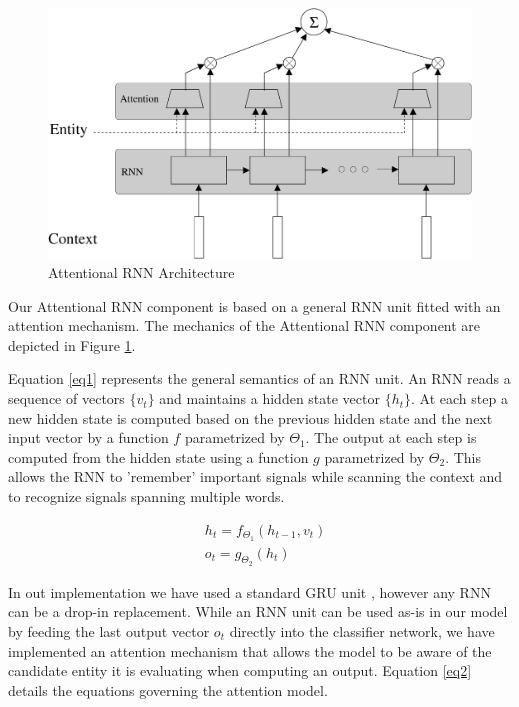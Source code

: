 \documentclass[11pt]{article}
\begin{document}
\begin{figure}
\centering
\includegraphics[scale=0.25]{diagrams/RNN_ATTN.pdf}
\caption{Attentional RNN Architecture}
\label{fig:arnn}
\end{figure}	

Our Attentional RNN component is based on a general RNN unit fitted with an attention mechanism. The mechanics of the Attentional RNN component are depicted in Figure \ref{fig:arnn}. 
	
Equation \ref{eq1} represents the general semantics of an RNN unit. An RNN reads a sequence of vectors $\{v_t\}$ and maintains a hidden state vector $\{h_t\}$. At each step a new hidden state is computed based on the previous hidden state and the next input vector by a function $f$ parametrized by $\Theta_1$. The output at each step is computed from the hidden state using a function $g$ parametrized by $\Theta_2$. This allows the RNN to 'remember' important signals while scanning the context and to recognize signals spanning multiple words.

\begin{equation}
\label{eq1}
\begin{aligned}
& h_t=f_{\Theta_1}(h_{t-1}, v_t) \\
& o_t=g_{\Theta_2}(h_t)
\end{aligned}
\end{equation}

In out implementation we have used a standard GRU unit \cite{cho2014learning}, however any RNN can be a drop-in replacement. While an RNN unit can be used as-is in our model by feeding the last output vector $o_t$ directly into the classifier network, we have implemented an attention mechanism that allows the model to be aware of the candidate entity it is evaluating when computing an output. Equation \ref{eq2} details the equations governing the attention model.
\end{document}
